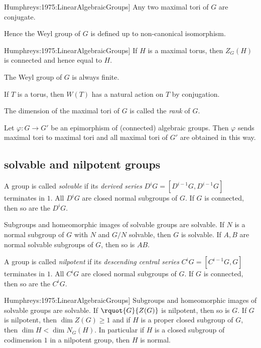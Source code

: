 \documentclass[english, no-theorem-numbers]{short-notes}
\newcommand\Humph[1]{\cite[#1]{Humphreys:1975:LinearAlgebraicGroups}}
\begin{document}
\begin{Thm}[\Humph{Cor.~21.3A}]
    Any two maximal tori of $G$ are conjugate.
\end{Thm}

Hence the Weyl group of $G$ is defined up to non-canonical isomorphism.

\begin{Thm}[\Humph{Thm.~22.3}]
    If $H$ is a maximal torus, then $Z_G(H)$ is connected and hence equal to $H$.
\end{Thm}

The Weyl group of $G$ is always finite.

If $T$ is a torus, then $W(T)$ has a natural action on $T$ by conjugation.

\begin{Def}
    The dimension of the maximal tori of $G$ is called the \emph{rank} of $G$.
\end{Def}

\begin{Prop}
    Let $φ\colon G → G'$ be an epimorphism of (connected) algebraic groups.
    Then $φ$ sends maximal tori to maximal tori and all maximal tori of $G'$ are obtained in this way.
\end{Prop}

\subsection*{solvable and nilpotent groups}

A group is called \emph{solvable} if its \emph{derived series} $D^{i}G = [D^{i-1}G,D^{i-1}G]$ terminates in $1$.
All $D^iG$ are closed normal subgroups of $G$. 
If $G$ is connected, then so are the $D^iG$.

\begin{Lem}
    Subgroups and homeomorphic images of solvable groups are solvable.
    If $N$ is a normal subgroup of $G$ with $N$ and $G/N$ solvable, then $G$ is solvable.
    If $A, B$ are normal solvable subgroups of $G$, then so is $AB$.
\end{Lem}

A group is called \emph{nilpotent} if its \emph{descending central series} $C^{i}G = [C^{i-1}G,G]$ terminates in $1$.
All $C^iG$ are closed normal subgroups of $G$. 
If $G$ is connected, then so are the $C^iG$.

\begin{Lem}[\Humph{Prop.~17.4}]
    Subgroups and homeomorphic images of solvable groups are solvable.
    If $\rquot{G}{Z(G)}$ is nilpotent, then so is $G$.
    If $G$ is nilpotent, then $\dim Z(G) \ge 1$ and if $H$ is a proper closed subgroup of $G$, then $\dim H < \dim N_G(H)$.
    In particular if $H$ is a closed subgroup of codimension $1$ in a nilpotent group, then $H$ is normal.
\end{Lem}
\end{document}
